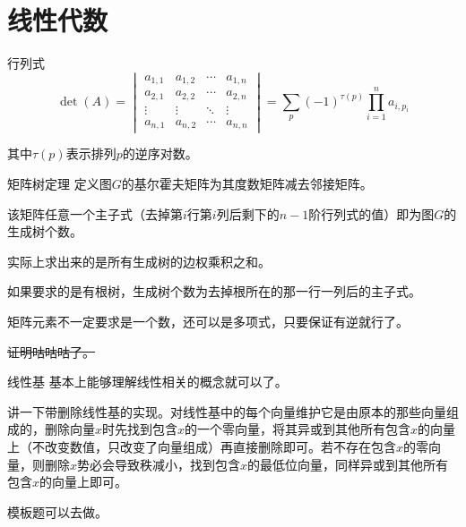 \documentclass{beamer}
\begin{document}
	\section{线性代数}
	\begin{frame}{行列式}
		$$
		\det(A)=
		\begin{vmatrix}
		a_{1,1} & a_{1,2} & \cdots & a_{1,n}\\
		a_{2,1} & a_{2,2} & \cdots & a_{2,n}\\
		\vdots  & \vdots  & \ddots & \vdots \\
		a_{n,1} & a_{n,2} & \cdots & a_{n,n}
		\end{vmatrix}
		=\sum_{p}(-1)^{\tau(p)}\prod_{i=1}^na_{i,p_i}
		$$
		
		其中$\tau(p)$表示排列$p$的逆序对数。
	\end{frame}
	\begin{frame}{矩阵树定理}
		定义图$G$的基尔霍夫矩阵为其度数矩阵减去邻接矩阵。
		
		该矩阵任意一个主子式（去掉第$i$行第$i$列后剩下的$n-1$阶行列式的值）即为图$G$的生成树个数。
		
		实际上求出来的是所有生成树的边权乘积之和。
		
		如果要求的是有根树，生成树个数为去掉根所在的那一行一列后的主子式。
		
		矩阵元素不一定要求是一个数，还可以是多项式，只要保证有逆就行了。
		
		\sout{证明咕咕咕了。}
	\end{frame}
	\begin{frame}{线性基}
		基本上能够理解线性相关的概念就可以了。
		
		讲一下带删除线性基的实现。对线性基中的每个向量维护它是由原本的那些向量组成的，删除向量$x$时先找到包含$x$的一个零向量，将其异或到其他所有包含$x$的向量上（不改变数值，只改变了向量组成）再直接删除即可。若不存在包含$x$的零向量，则删除$x$势必会导致秩减小，找到包含$x$的最低位向量，同样异或到其他所有包含$x$的向量上即可。
		
		模板题可以去做\href{http://uoj.ac/problem/91}{\color{pink}{【集训队互测2015】最大异或和}}。
	\end{frame}
\end{document}
